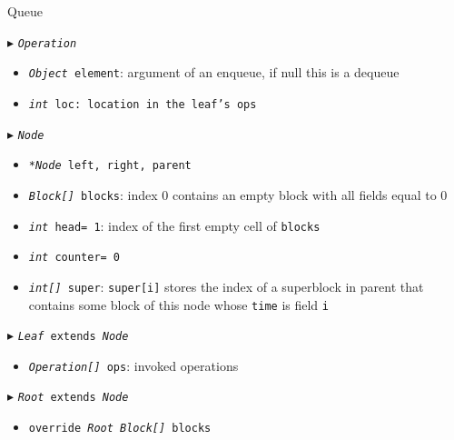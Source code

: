 \documentclass[10pt]{article}
\theoremstyle{definition}
\begin{document}
\begin{algorithm}
\caption{Queue \label{algQ}}
\begin{algorithmic}[1]
\begin{multicols}{2}


\Statex $\blacktriangleright$ \texttt{\textsl{Operation}}
\begin{itemize}
\item \texttt{\textsl{Object} element}\textsf{: argument of an enqueue, if null this is a dequeue}
\item \texttt{\textsl{int} loc\textsf{: location in the leaf's \texttt{ops}}}
\end{itemize}


\Statex $\blacktriangleright$ \texttt{\textsl{Node}}
\begin{itemize}
\item \texttt{\textsl{*Node} left, right, parent}
\item \texttt{\textsl{Block[]} blocks}\textsf{: index 0 contains an empty block with all fields equal to 0}
\item \texttt{\textsl{int} head= 1}\textsf{: index of the first empty cell of \texttt{blocks}}
\item \texttt{\textsl{int} counter= 0}\textsf{}
\item \texttt{\textsl{int[]} super}\textsf{: \texttt{super[i]} stores the index of a superblock in parent that contains some block of this node whose \texttt{time} is field \texttt{i}}
\end{itemize}

\Statex $\blacktriangleright$ \texttt{\textsl{Leaf} extends \textsl{Node}}
\Statex {}
\begin{itemize}
\item \texttt{\textsl{Operation[]} ops}\textsf{: invoked operations}
\end{itemize}

\Statex $\blacktriangleright$ \texttt{\textsl{Root} extends \textsl{Node}}
\begin{itemize}
\item \texttt{override \textsl{Root Block[]} blocks}
\end{itemize}



\end{multicols}
\end{algorithmic}
\end{algorithm}
\end{document}
